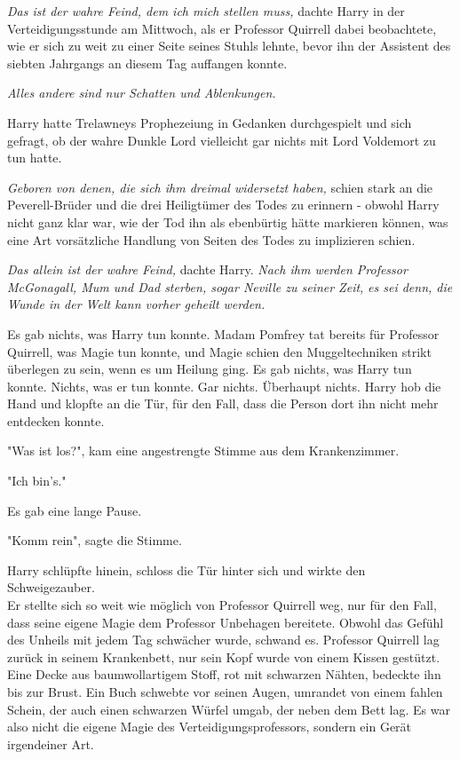 {\emph{Das ist der wahre Feind, dem ich mich stellen muss,} dachte Harry in der Verteidigungsstunde am Mittwoch, als er Professor Quirrell dabei beobachtete, wie er sich zu weit zu einer Seite seines Stuhls lehnte, bevor ihn der Assistent des siebten Jahrgangs an diesem Tag auffangen konnte.

\emph{Alles andere sind nur Schatten und Ablenkungen.}

Harry hatte Trelawneys Prophezeiung in Gedanken durchgespielt und sich gefragt, ob der wahre Dunkle Lord vielleicht gar nichts mit Lord Voldemort zu tun hatte.

\emph{Geboren von denen, die sich ihm dreimal widersetzt haben,} schien stark an die Peverell-Brüder und die drei Heiligtümer des Todes zu erinnern - obwohl Harry nicht ganz klar war, wie der Tod ihn als ebenbürtig hätte markieren können, was eine Art vorsätzliche Handlung von Seiten des Todes zu implizieren schien.

\emph{Das allein ist der wahre Feind,} dachte Harry. \emph{Nach ihm werden Professor McGonagall, Mum und Dad sterben, sogar Neville zu seiner Zeit,} \emph{es sei denn, die Wunde in der Welt kann vorher geheilt werden.}

Es gab nichts, was Harry tun konnte. Madam Pomfrey tat bereits für Professor Quirrell, was Magie tun konnte, und Magie schien den Muggeltechniken strikt überlegen zu sein, wenn es um Heilung ging. Es gab nichts, was Harry tun konnte. Nichts, was er tun konnte. Gar nichts. Überhaupt nichts. Harry hob die Hand und klopfte an die Tür, für den Fall, dass die Person dort ihn nicht mehr entdecken konnte.

"Was ist los?", kam eine angestrengte Stimme aus dem Krankenzimmer.

"Ich bin's."

Es gab eine lange Pause.

"Komm rein", sagte die Stimme.

Harry schlüpfte hinein, schloss die Tür hinter sich und wirkte den Schweigezauber.\\ Er stellte sich so weit wie möglich von Professor Quirrell weg, nur für den Fall, dass seine eigene Magie dem Professor Unbehagen bereitete. Obwohl das Gefühl des Unheils mit jedem Tag schwächer wurde, schwand es. Professor Quirrell lag zurück in seinem Krankenbett, nur sein Kopf wurde von einem Kissen gestützt. Eine Decke aus baumwollartigem Stoff, rot mit schwarzen Nähten, bedeckte ihn bis zur Brust. Ein Buch schwebte vor seinen Augen, umrandet von einem fahlen Schein, der auch einen schwarzen Würfel umgab, der neben dem Bett lag. Es war also nicht die eigene Magie des Verteidigungsprofessors, sondern ein Gerät irgendeiner Art.

}
